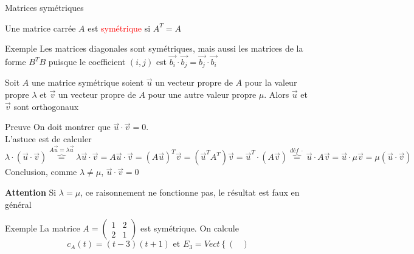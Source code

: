        \begin{parag}{Matrices symétriques}
            \begin{definition}
                Une matrice carrée $A$ est \textcolor{red}{symétrique} si $A^T = A$
            \end{definition}
            \begin{subparag}{Exemple}
                Les matrices diagonales sont symétriques, mais aussi les matrices de la forme $B^TB$ puisque le coefficient $(i, j)$ est $\vec{b_i}\cdot\vec{b_j} = \vec{b_j}\cdot \vec{b_i}$
            \end{subparag}
            \begin{theoreme}
                Soit $A$ une matrice symétrique soient $\vec{u}$ un vecteur propre de $A$ pour la valeur propre $\lambda$ et $\vec{v}$ un vecteur propre de $A$ pour une autre valeur propre $\mu$. Alors $\vec{u}$ et $\vec{v}$ sont orthogonaux
            \end{theoreme}
            \begin{subparag}{Preuve}
                On doit montrer que $\vec{u}\cdot \vec{v} = 0$.
                \\
                L'astuce est de calculer $\lambda\cdot(\vec{u}\cdot\vec{v}) \overbrace{=}^{A\vec{u} = \lambda\vec{u}} \lambda \vec{u}\cdot\vec{v} = A\vec{u}\cdot\vec{v} = (A\vec{u})^T\vec{v} = (\vec{u}^TA^T)\vec{v} = \vec{u}^T\cdot(A\vec{v}) \overbrace{=}^{déf \; \cdot} \vec{u}\cdot A\vec{v} = \vec{u}\cdot\mu\vec{v} = \mu(\vec{u}\cdot\vec{v})$ 
                \\
                Conclusion, comme $\lambda \neq \mu$, $\vec{u}\cdot\vec{v} = 0$
                \\
                \begin{framedremark}
                    \textbf{Attention}
                Si $\lambda = \mu$, ce raisonnement ne fonctionne pas, le résultat est faux en général
                \end{framedremark}
            \end{subparag}
            \begin{subparag}{Exemple}
                La matrice $A = \begin{pmatrix}
                    1 & 2\\
                    2 & 1
                \end{pmatrix}$ est symétrique. On calcule
                \[c_A(t) = (t-3)(t+1) \text{ et } E_3 = Vect\left\{\begin{pmatrix}

\end{pmatrix}\]
\end{subparag}
\end{parag}

